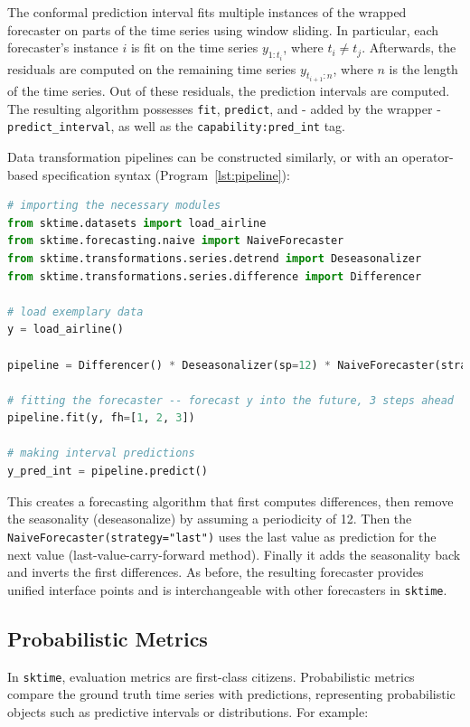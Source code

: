 The conformal prediction interval fits multiple instances of the wrapped forecaster on parts of the time series using window sliding. In particular, each forecaster's instance $i$
is fit on the time series $y_{1:t_i}$, where $t_i \neq t_j$. Afterwards, the residuals are computed on the remaining time series $y_{t_{i+1}:n}$, where $n$ is the length of the time series.
Out of these residuals, the prediction intervals are computed.
The resulting algorithm possesses \texttt{fit}, \texttt{predict}, and - added by the wrapper - \texttt{predict\_interval}, as well as the \texttt{capability:pred\_int} tag.

Data transformation pipelines can be constructed similarly, or with an operator-based specification syntax (Program~\ref{lst:pipeline}):

\begin{lstlisting}[language=Python, caption=Code to construct a pipeline with a differencer and a seasonalizer, label=lst:pipeline]
# importing the necessary modules
from sktime.datasets import load_airline
from sktime.forecasting.naive import NaiveForecaster
from sktime.transformations.series.detrend import Deseasonalizer
from sktime.transformations.series.difference import Differencer

# load exemplary data
y = load_airline()

pipeline = Differencer() * Deseasonalizer(sp=12) * NaiveForecaster(strategy="last")

# fitting the forecaster -- forecast y into the future, 3 steps ahead
pipeline.fit(y, fh=[1, 2, 3])

# making interval predictions
y_pred_int = pipeline.predict()
\end{lstlisting}

This creates a forecasting algorithm that first computes differences, then remove the seasonality (deseasonalize) by assuming a periodicity of 12.
Then the \texttt{NaiveForecaster(strategy="last")} uses the last value as prediction for the next value (last-value-carry-forward method).  Finally it adds the seasonality back
and inverts the first differences.
As before, the resulting forecaster provides unified interface points and is interchangeable with other forecasters in \texttt{sktime}.

\subsection{Probabilistic Metrics}
In \texttt{sktime}, evaluation metrics are first-class citizens. Probabilistic metrics compare the ground truth time series with predictions, representing probabilistic objects such as predictive intervals or distributions. For example:

